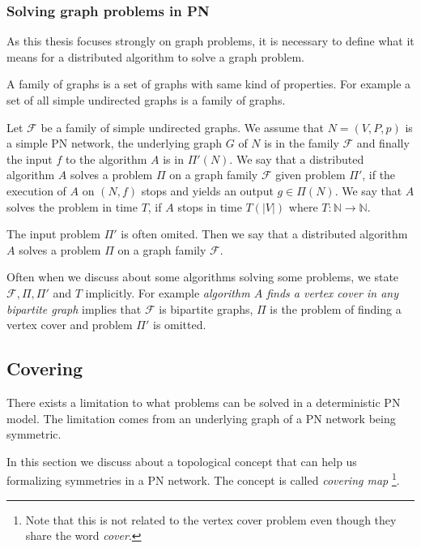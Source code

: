 
\subsubsection{Solving graph problems in PN}
As this thesis focuses strongly on graph problems, it is necessary to define what it means for a distributed algorithm to solve a graph problem.

A family of graphs is a set of graphs with same kind of properties.
For example a set of all simple undirected graphs is a family of graphs.

Let $\mathcal{F}$ be a family of simple undirected graphs.
We assume that $N=(V, P, p)$ is a simple PN network, the underlying graph $G$ of $N$ is in the family $\mathcal{F}$ and finally the input $f$ to the algorithm $A$ is in $\Pi'(N)$.
We say that a distributed algorithm $A$ solves a problem $\Pi$ on a graph family $\mathcal{F}$ given problem $\Pi'$, if the execution of $A$ on $(N, f)$ stops and yields an output $g \in \Pi(N)$.
We say that $A$ solves the problem in time $T$, if $A$ stops in time $T(|V|)$ where $T: \mathbb{N} \rightarrow \mathbb{N}$.

The input problem $\Pi'$ is often omited.
Then we say that a distributed algorithm $A$ solves a problem $\Pi$ on a graph family $\mathcal{F}$.

Often when we discuss about some algorithms solving some problems, we state $\mathcal{F}, \Pi, \Pi'$ and $T$ implicitly.
For example \emph{algorithm $A$ finds a vertex cover in any bipartite graph} implies that $\mathcal{F}$ is bipartite graphs, $\Pi$ is the problem of finding a vertex cover and problem $\Pi'$ is omitted.



\subsection{Covering }
There exists a limitation to what problems can be solved in a deterministic PN model.
The limitation comes from an underlying graph of a PN network being symmetric.
\cite{DBLP:conf/focs/Linial87}
\cite{DBLP:journals/siamcomp/Linial92}

In this section we discuss about a topological concept that can help us formalizing symmetries in a PN network.
The concept is called \emph{covering map}
\footnote{Note that this is not related to the vertex cover problem even though they share the word \emph{cover}.}.

